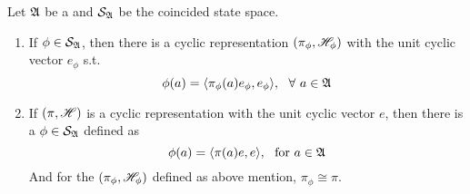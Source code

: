 \documentclass[a4paper,11pt]{report}
\begin{document}
\begin{thm}
	Let $\mathfrak{A}$ be a \Cs and $\mathcal{S}_{\mathfrak{A}}$ be the coincided state space.
	\begin{enumerate}[label=\arabic*)]
		\item If $\phi \in \mathcal{S}_{\mathfrak{A}}$, then there is a cyclic representation $(\pi_{\phi},\mathscr{H}_{\phi})$ with the unit cyclic vector $e_{\phi}$ s.t.
		\begin{equation*}
			\phi(a) = \langle \pi_{\phi}(a)e_{\phi},e_{\phi} \rangle ,~~\forall~ a \in \mathfrak{A}
		\end{equation*}
		\item If $(\pi,\mathscr{H})$ is a cyclic representation with the unit cyclic vector $e$, then there is a $\phi \in \mathcal{S}_{\mathfrak{A}}$ defined as 
		\begin{equation*}
			\phi(a) = \langle \pi(a)e, e \rangle,~~ \text{for}~ a \in \mathfrak{A}
		\end{equation*}
		And for the $(\pi_{\phi},\mathscr{H}_{\phi})$ defined as above mention, $\pi_{\phi} \cong \pi$.
	\end{enumerate}
\end{thm}
\end{document}
